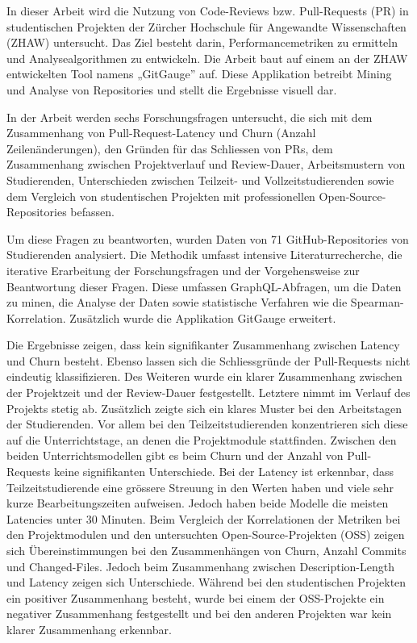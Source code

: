 \begin{extraAbstract}
\addchaptertocentry{\extraabstractname} %
In dieser Arbeit wird die Nutzung von Code-Reviews bzw. Pull-Requests (PR) in studentischen Projekten der Zürcher Hochschule für Angewandte Wissenschaften (ZHAW) untersucht. Das Ziel besteht darin, Performancemetriken zu ermitteln und Analysealgorithmen zu entwickeln.
Die Arbeit baut auf einem an der ZHAW entwickelten Tool namens „GitGauge” auf. Diese Applikation betreibt Mining und Analyse von Repositories und stellt die Ergebnisse visuell dar.

 In der Arbeit werden sechs Forschungsfragen untersucht, die sich mit dem Zusammenhang von Pull-Request-Latency und Churn (Anzahl Zeilenänderungen), den Gründen für das Schliessen von PRs, dem Zusammenhang zwischen Projektverlauf und Review-Dauer, Arbeitsmustern von Studierenden, Unterschieden zwischen Teilzeit- und Vollzeitstudierenden sowie dem Vergleich von studentischen Projekten mit professionellen Open-Source-Repositories befassen.

 Um diese Fragen zu beantworten, wurden Daten von 71 GitHub-Repositories von Studierenden analysiert. Die Methodik umfasst intensive Literaturrecherche, die iterative Erarbeitung der Forschungsfragen und der Vorgehensweise zur Beantwortung dieser Fragen. Diese umfassen GraphQL-Abfragen, um die Daten zu minen, die Analyse der Daten sowie statistische Verfahren wie die Spearman-Korrelation. Zusätzlich wurde die Applikation GitGauge erweitert.
 

 Die Ergebnisse zeigen, dass kein signifikanter Zusammenhang zwischen Latency und Churn besteht. Ebenso lassen sich die Schliessgründe der Pull-Requests nicht eindeutig klassifizieren. Des Weiteren wurde ein klarer Zusammenhang zwischen der Projektzeit und der Review-Dauer festgestellt. Letztere nimmt im Verlauf des Projekts stetig ab. Zusätzlich zeigte sich ein klares Muster bei den Arbeitstagen der Studierenden. Vor allem bei den Teilzeitstudierenden konzentrieren sich diese auf die Unterrichtstage, an denen die Projektmodule stattfinden. Zwischen den beiden Unterrichtsmodellen gibt es beim Churn und der Anzahl von Pull-Requests keine signifikanten Unterschiede. Bei der Latency ist erkennbar, dass Teilzeitstudierende eine grössere Streuung in den Werten haben und viele sehr kurze Bearbeitungszeiten aufweisen. Jedoch haben beide Modelle die meisten Latencies unter 30 Minuten.
 Beim Vergleich der Korrelationen der Metriken bei den Projektmodulen und den untersuchten Open-Source-Projekten (OSS) zeigen sich Übereinstimmungen bei den Zusammenhängen von Churn, Anzahl Commits und Changed-Files. Jedoch beim Zusammenhang zwischen Description-Length und Latency zeigen sich Unterschiede. Während bei den studentischen Projekten ein positiver Zusammenhang besteht, wurde bei einem der OSS-Projekte ein negativer Zusammenhang festgestellt und bei den anderen Projekten war kein klarer Zusammenhang erkennbar. 
 

\end{extraAbstract}
